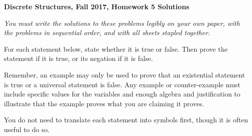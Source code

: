 \documentclass[12pt, letterpaper]{report}
\begin{document}
{\textbf{Discrete Structures, Fall 2017, Homework 5 Solutions}}

\medbreak

\textit{You must write the solutions to these problems legibly on your own paper, with
the problems in sequential order, and with all sheets stapled together.}

\bigskip

For each statement below, state whether it is true or false. Then prove the statement if it is true,
or its negation if it is false.\medskip

Remember, an example may only be used to prove that an existential statement is true or a universal
statement is false. Any example or counter-example must include specific values for the variables
and enough algebra and justification to illustrate that the example proves what you are claiming
it proves.\medskip

You do not need to translate each statement into symbols first, though it is often useful to do so.
\end{document}
